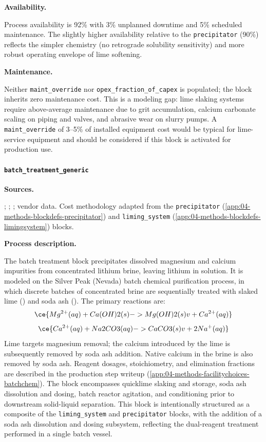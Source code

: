 \medskip
\noindent\textbf{Availability.}\quad

Process availability is 92\% with 3\% unplanned downtime and 5\% scheduled maintenance. The slightly higher availability relative to the \texttt{precipitator} (90\%) reflects the simpler chemistry (no retrograde solubility sensitivity) and more robust operating envelope of lime softening.

\medskip
\noindent\textbf{Maintenance.}\quad

Neither \texttt{maint\_override} nor \texttt{opex\_fraction\_of\_capex} is populated; the block inherits zero maintenance cost. This is a modeling gap: lime slaking systems require above-average maintenance due to grit accumulation, calcium carbonate scaling on piping and valves, and abrasive wear on slurry pumps. A \texttt{maint\_override} of 3--5\% of installed equipment cost would be typical for lime-service equipment and should be considered if this block is activated for production use.

\clearpage
\paragraph{\texttt{batch\_treatment\_generic}}\label{app:04-methods-blockdefs-batchtreat}

\medskip
\noindent\textbf{Sources.}\quad

\citet{srkconsultingSECTechnicalReport2023a}; \citet{ausimmMonograph27Cost}; \citet{petersPlantDesignEconomics1991}; vendor data. Cost methodology adapted from the \texttt{precipitator} (\ref{app:04-methods-blockdefs-precipitator}) and \texttt{liming\_system} (\ref{app:04-methods-blockdefs-limingsystem}) blocks.

\medskip
\noindent\textbf{Process description.}\quad

The batch treatment block precipitates dissolved magnesium and calcium impurities from concentrated lithium brine, leaving lithium in solution. It is modeled on the Silver Peak (Nevada) batch chemical purification process, in which discrete batches of concentrated brine are sequentially treated with slaked lime () and soda ash (). The primary reactions are:
\begin{equation}
	\ce{Mg^{2+}(aq) + Ca(OH)2(s) -> Mg(OH)2(s) v + Ca^{2+}(aq)}
\end{equation}
\begin{equation}
	\ce{Ca^{2+}(aq) + Na2CO3(aq) -> CaCO3(s) v + 2Na^{+}(aq)}
\end{equation}
Lime targets magnesium removal; the calcium introduced by the lime is subsequently removed by soda ash addition. Native calcium in the brine is also removed by soda ash. Reagent dosages, stoichiometry, and elimination fractions are described in the production step writeup (\ref{app:04-methods-facilitychoices-batchchem}). The block encompasses quicklime slaking and storage, soda ash dissolution and dosing, batch reactor agitation, and conditioning prior to downstream solid-liquid separation. This block is intentionally structured as a composite of the \texttt{liming\_system} and \texttt{precipitator} blocks, with the addition of a soda ash dissolution and dosing subsystem, reflecting the dual-reagent treatment performed in a single batch vessel.

